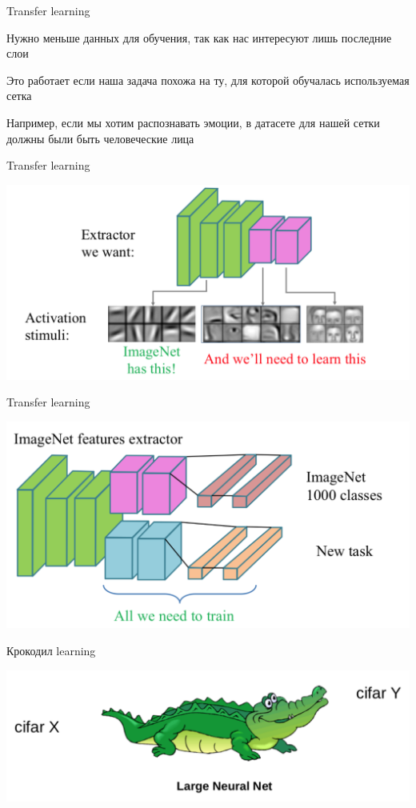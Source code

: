 \documentclass[notes,12pt, aspectratio=169]{beamer}
\newenvironment{wideitemize}{\itemize\addtolength{\itemsep}{10pt}}{\enditemize}
\begin{document}
\begin{frame}{Transfer learning}
\begin{wideitemize}
	\item  Нужно меньше данных для обучения, так как нас интересуют лишь последние слои
	\item  Это работает если наша задача похожа на ту, для которой обучалась используемая сетка
	\item  Например, если мы хотим распознавать эмоции, в датасете для нашей сетки должны были быть человеческие лица
\end{wideitemize}
\end{frame}


\begin{frame}{Transfer learning}
\begin{center}
	\includegraphics[width=.8\linewidth]{transfer_learning3.png}
\end{center}
\end{frame}


\begin{frame}{Transfer learning}
\begin{center}
	\includegraphics[width=.8\linewidth]{transfer_learning4.png}
\end{center}
\end{frame}

\begin{frame}{Крокодил learning}
\begin{center}
	\includegraphics[width=.8\linewidth]{croc_1.png}
\end{center}
\end{frame}
\end{document}
